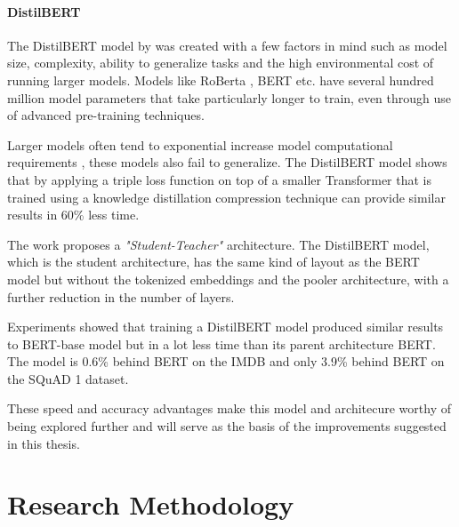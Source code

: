 \documentclass[a4paper,12pt]{report}
\begin{document}


	    \subsubsection{DistilBERT}\label{distilLitrev}
	    The DistilBERT model by \citep{distil} was created with a few factors in  mind such as model size, complexity, ability to generalize tasks and the high environmental cost of running larger models. Models like RoBerta \citep{roberta}, BERT \citep{bert} etc. have several hundred million model parameters that take particularly longer to train, even through use of advanced pre-training techniques. 
	    
	    Larger models often tend to exponential increase model computational requirements \citep{schwarts}, these models also fail to generalize. The DistilBERT model shows that by applying a triple loss function on top of a smaller Transformer \citep{atayl} that is trained using a knowledge distillation compression technique \citep{knowledgeDistilation} can provide similar results in 60\% less time. 
	    
	    The work proposes a \textit{"Student-Teacher"} architecture. The DistilBERT model, which is the student architecture, has the same kind of layout as the BERT model but without the tokenized embeddings and the pooler architecture, with a further reduction in the number of layers. 
	    
	    Experiments showed that training a DistilBERT model produced similar results to BERT-base model but in a lot less time than its parent architecture BERT. The model is 0.6\% behind BERT on the IMDB and only 3.9\% behind BERT on the SQuAD 1 dataset. 
	    
	    These speed and accuracy advantages make this model and architecure worthy of being explored further and will serve as the basis of the improvements suggested in this thesis.



    \chapter{Research Methodology}\label{c3researchmeth}
\end{document}
